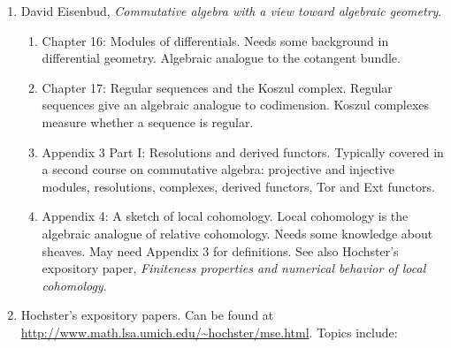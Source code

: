 \documentclass[12pt]%
{article}
\begin{document}
\begin{enumerate}
\item David Eisenbud, \textit{Commutative algebra with a view toward algebraic geometry}.  %
\begin{enumerate}
	\item Chapter 16: Modules of differentials.  Needs some background in differential geometry.  Algebraic analogue to the cotangent bundle.  
	\item Chapter 17: Regular sequences and the Koszul complex.  Regular sequences give an algebraic analogue to codimension.  Koszul complexes measure whether a sequence is regular.
	\item Appendix 3 Part I: Resolutions and derived functors.  Typically covered in a second course on commutative algebra: projective and injective modules, resolutions, complexes, derived functors, Tor and Ext functors.
	\item Appendix 4: A sketch of local cohomology.  Local cohomology is the algebraic analogue of relative cohomology.  Needs some knowledge about sheaves.  May need Appendix 3 for definitions.  See also Hochster's expository paper, \textit{Finiteness properties and numerical behavior of local cohomology}.
\end{enumerate}
\item Hochster's expository papers.  Can be found at \url{http://www.math.lsa.umich.edu/~hochster/mse.html}.  Topics include:

\end{enumerate}
\end{document}
